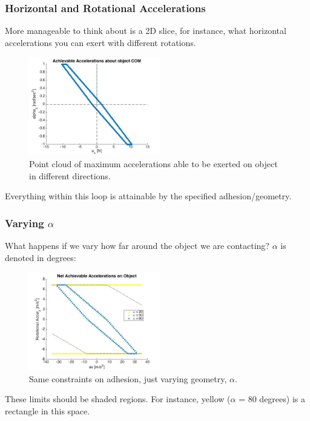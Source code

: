\documentclass{beamer}
\begin{document}
\frame
{
\frametitle{ Horizontal and Rotational Accelerations  }

More manageable to think about is a 2D slice, for instance, what horizontal accelerations you can exert with different rotations. 

\begin{figure}[htb]
	\centering
	\includegraphics[width=2.25in]{images/AxAzAccelerations.jpg}
	\caption{Point cloud of maximum accelerations able to be exerted on object in different directions.}
	\label{fig:accel}
\end{figure}

Everything within this loop is attainable by the specified adhesion/geometry. 
	
}


\frame
{
\frametitle{ Varying $\alpha$}

What happens if we vary how far around the object we are contacting? $\alpha$ is denoted in degrees: 

\begin{figure}[htb]
	\centering
	\includegraphics[width=2.25in]{images/VaryingAlpha.jpg}
	\caption{Same constraints on adhesion, just varying geometry, $\alpha$.}
\end{figure}
	These limits should be shaded regions. For instance, yellow ($\alpha$ = 80 degrees) is a rectangle in this space. 
}
\end{document}
